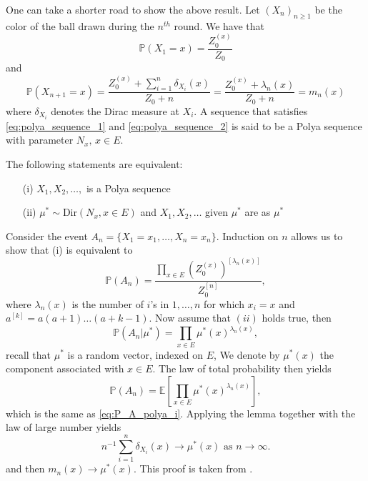 \begin{remark}\label{req:alternative_proof}
One can take a shorter road to show the above result. Let $(X_n)_{n\geq1}$ be the color of the ball drawn during the $n^{th}$ round. We have that 
\begin{equation}\label{eq:polya_sequence_1}
\mathbb{P}(X_1=x) = \frac{Z_0^{(x)}}{Z_{0}}
\end{equation}
and 
\begin{equation}\label{eq:polya_sequence_2}
\mathbb{P}(X_{n+1}=x) = \frac{Z_0^{(x)} + \sum_{i=1}^n\delta_{X_i}(x)}{Z_0+n} = \frac{Z_0^{(x)} + \lambda_n(x)}{Z_0+n} = m_n(x)
\end{equation}
where $\delta_{X_i}$ denotes the Dirac measure at $X_i$.
A sequence that satisfies \eqref{eq:polya_sequence_1} and \eqref{eq:polya_sequence_2} is said to be a Polya sequence with parameter $N_x\text{, }x\in E$.
\begin{lemma}
The following statements are equivalent:
\begin{itemize}
\item[(i)] $X_1,X_2,\ldots,$ is a Polya sequence
\item[(ii)] $\mu^{\ast}\sim \text{Dir}(N_x,x\in E)$ and $X_1,X_2,\ldots$ given $\mu^\ast$ are \iid as $\mu^\ast$
\end{itemize}
\end{lemma}
Consider the event $A_n = \{X_1 = x_1,\ldots, X_n = x_n\}$. Induction on $n$ allows us to show that (i) is equivalent to 
\begin{equation}\label{eq:P_A_polya_i}
\mathbb{P}(A_n) = \frac{\prod_{x\in E} \left(Z_0^{(x)}\right)^{[\lambda_n(x)]}}{Z_0^{[n]}},
\end{equation}
where $\lambda_n(x)$ is the number of $i$'s in $1,\ldots, n$ for which $x_i = x$ and $a^{[k]} = a(a+1)\ldots(a+k-1)$.  Now assume that $(ii)$ holds true, then 
$$
\mathbb{P}(A_n|\mu^\ast) = \prod_{x\in E}\mu^\ast(x)^{\lambda_n(x)},
$$
recall that $\mu^\ast$ is a random vector, indexed on $E$, We denote by $\mu^\ast(x)$ the component associated with $x\in E$. The law of total probability then yields
\begin{equation}\label{eq:P_A_polya_ii}
\mathbb{P}(A_n) = \mathbb{E}\left[\prod_{x\in E}\mu^\ast(x)^{\lambda_n(x)}\right],
\end{equation}
which is the same as \eqref{eq:P_A_polya_i}. Applying the lemma together with the law of large number yields 
$$
n^{-1}\sum_{i=1}^n\delta_{X_i}(x) \rightarrow \mu^{\ast}(x)\text{ as } n\rightarrow\infty.
$$
and then $m_n(x)\rightarrow\mu^{\ast}(x)$. This proof is taken from \citet{Blackwell1973}.
\end{remark}

